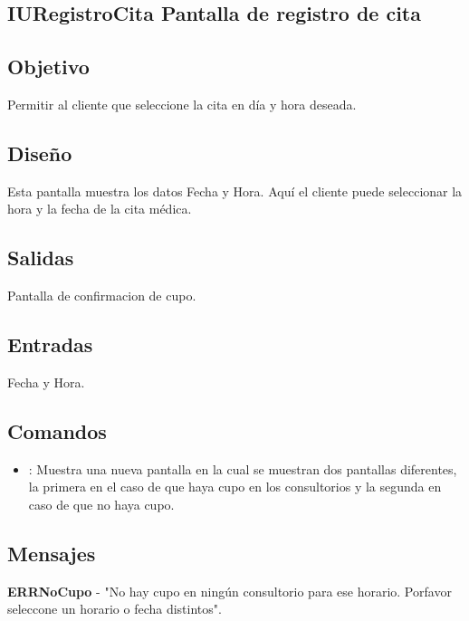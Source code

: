 \subsection{IURegistroCita Pantalla de registro de cita}

\subsection{Objetivo}
	Permitir al cliente que seleccione la cita en d\'ia y hora deseada.

\subsection{Diseño}
	Esta pantalla muestra los datos Fecha y  Hora. Aqu\'i  el cliente puede seleccionar la hora y la fecha de la cita m\'edica.


\subsection{Salidas}

	Pantalla de confirmacion de cupo.

\subsection{Entradas}

Fecha y Hora.

\subsection{Comandos}
\begin{itemize}
		\item {}: Muestra una nueva pantalla en la cual se muestran dos pantallas diferentes, la primera en el caso de que haya cupo en los consultorios y la segunda en caso de que no haya cupo.


\end{itemize}

\subsection{Mensajes}
	\begin{Citemize}
		\item {\bf ERRNoCupo} - "No hay cupo en ning\'un consultorio para ese horario. Porfavor seleccone un horario o fecha distintos".
	\end{Citemize}

